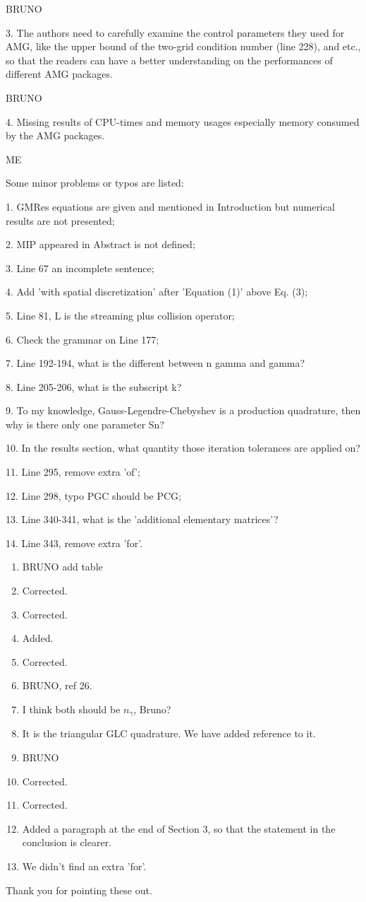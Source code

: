 \documentclass{article}
\begin{document}
BRUNO

\bigskip


{
\color{blue}
3. The authors need to carefully examine the control parameters they used for AMG, like the upper bound of the two-grid condition number (line 228), and etc., so that the readers can have a better understanding on the performances of different AMG packages.
}

BRUNO

\bigskip


{
\color{blue}
4. Missing results of CPU-times and memory usages especially memory consumed by the AMG packages.
}


ME

\bigskip


{
\color{blue}
\noindent
Some minor problems or typos are listed:

1. GMRes equations are given and mentioned in Introduction but numerical results are not presented;

2. MIP appeared in Abstract is not defined;

3. Line 67 an incomplete sentence;

4. Add 'with spatial discretization' after 'Equation (1)' above Eq. (3);

5. Line 81, L is the streaming plus collision operator;

6. Check the grammar on Line 177;

7. Line 192-194, what is the different between n gamma and gamma?

8. Line 205-206, what is the subscript k?

9. To my knowledge, Gauss-Legendre-Chebyshev is a production quadrature, then why is there only one parameter Sn?

10. In the results section, what quantity those iteration tolerances are applied on?

11. Line 295, remove extra 'of';

12. Line 298, typo PGC should be PCG;

13. Line 340-341, what is the 'additional elementary matrices'?

14. Line 343, remove extra 'for'.}



\begin{enumerate}
\item BRUNO add table
\item Corrected.
\item Corrected.
\item Added.
\item Corrected.
\item BRUNO, ref 26.
\item I think both should be $n_\gamma$, Bruno?
\item It is the triangular GLC quadrature. We have added reference to it.
\item BRUNO
\item Corrected.
\item Corrected.
\item Added a paragraph at the end of Section 3, so that the statement in the conclusion is clearer.
\item We didn't find an extra 'for'.
\end{enumerate}

\noindent 
Thank you for pointing these out.
\end{document}
